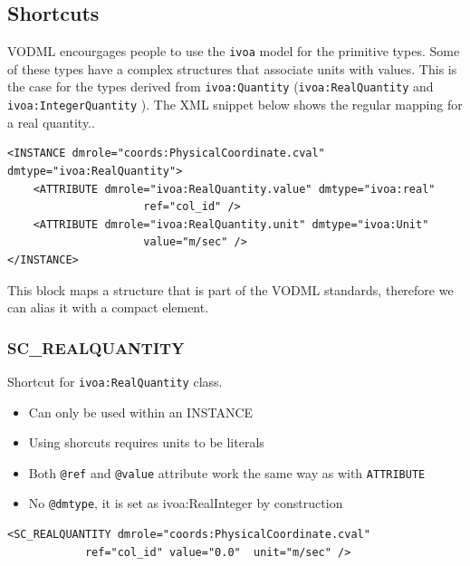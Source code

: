 \documentclass[11pt,a4paper]{ivoa}
\begin{document}
%
%

\subsection{Shortcuts}
VODML encourgages people to use the \texttt{ivoa} model for the primitive types. 
Some of these types have a complex structures that associate units with values. 
This is the case for the types derived from \texttt{ivoa:Quantity} (\texttt{ivoa:RealQuantity} and \texttt{ivoa:IntegerQuantity} ).
The XML snippet below shows the regular mapping for a real quantity..

\begin{lstlisting}[caption={ivoa:RealQuantity example},style=XML]
<INSTANCE dmrole="coords:PhysicalCoordinate.cval"
dmtype="ivoa:RealQuantity">
    <ATTRIBUTE dmrole="ivoa:RealQuantity.value" dmtype="ivoa:real"
                     ref="col_id" />
    <ATTRIBUTE dmrole="ivoa:RealQuantity.unit" dmtype="ivoa:Unit"
                     value="m/sec" />
</INSTANCE>
\end{lstlisting}



This block maps a structure that is part of the VODML standards, therefore we can alias it with a compact element.

\subsubsection{SC\_REALQUANTITY}
Shortcut for \texttt{ivoa:RealQuantity} class.

\begin{itemize}
    \item Can only be used within an INSTANCE      
    \item Using shorcuts requires units to be literals   
    \item Both \texttt{@ref} and \texttt{@value} attribute work the same way as with \texttt{ATTRIBUTE}
    \item No \texttt{@dmtype},  it is set as ivoa:RealInteger by construction
 \end{itemize}


\begin{lstlisting}[caption={\texttt{ivoa:RealQuantity} example},style=XML]
<SC_REALQUANTITY dmrole="coords:PhysicalCoordinate.cval"
            ref="col_id" value="0.0"  unit="m/sec" />
\end{lstlisting}
\end{document}
